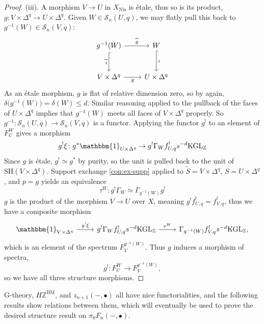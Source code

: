 \documentclass[11pt, twoside]{article}
\numberwithin{equation}{section}
\theoremstyle{definition}
\newcommand{\bb}[1]{\mathbb{#1}}
\newcommand{\Kgl}{\mathrm{KGL}}
\newcommand{\sh}{\mathrm{SH}}
\newcommand{\bm}{\mathrm{BM}}
\newcommand{\nis}{\mathrm{Nis}}
\newcommand{\G}{\mathrm{G}}
\begin{document}
\begin{proof}
\item (iii). A morphism \(V \to U\) in \(X_\nis\) is étale, thus so is its product, \(g \colon V \times \Delta^q \to U \times \Delta^q\). Given \(W \in \mathcal{S}_n(U, q)\), we may flatly pull this back to \(g^{- 1}(W) \in \mathcal{S}_n(V, q)\): 
\[\begin{tikzcd} [row sep = large]
g^{- 1}(W) \ar[d, "\tilde{i}", hookrightarrow, swap] \ar[r, "\tilde{g}"] & W \ar[d, "i", hookrightarrow]\\
V \times \Delta^q \ar[r, "g", swap] & U \times \Delta^q
\end{tikzcd}\]
As an étale morphism, \(g\) is flat of relative dimension zero, so by  \cite[Tag 02R8]{Sta} again, \(\delta\big(g^{- 1}(W)\big) = \delta(W) \leq d\). Similar reasoning applied to the pullback of the faces of \(U \times \Delta^q\) implies that \(g^{- 1}(W)\) meets all faces of \(V \times \Delta^q\) properly. So \(g^{- 1} \colon \mathcal{S}_n(U, q) \to \mathcal{S}_n(V, q)\) is a functor. Applying the functor \(g^!\) to an element of \(F_U^W\)  gives a morphism 
\[g^!\xi \colon g^*\mathbbm{1}_{U \times \Delta^q} \to g^!\Gamma_W f_{U, q}^! s^{- d} \Kgl_\bb{Z}\]
Since \(g\) is étale, \(g^! \simeq g^*\) by purity, so the unit is pulled back to the unit of \(\sh(V \times \Delta^q)\). Support exchange \ref{con:ex-supp} applied to \(\tilde{S} = V \times \Delta^q\), \(S = U \times \Delta^q\), and \(p = g\) yields an equivalence 
\[\tau^W \colon g^! \Gamma_W \simeq \Gamma_{g^{- 1}(W)} g^!\]
\(g\) is the product of the morphism \(V \to U\) over \(X\), meaning \(g^! f_{U, q}^! = f_{V, q}^!\), thus we have a composite morphism 
\[\begin{tikzcd}
\mathbbm{1}_{V \times \Delta^q} \ar[r, "g^! \xi"] & g^! \Gamma_W f_{U, q}^! s^{- d} \Kgl_\bb{Z} \ar[r, "\tau^W"] & \Gamma_{g^{- 1}(W)} f_{V, q}^! s^{- d} \Kgl_\bb{Z},
\end{tikzcd}\]
which is an element of the spectrum \(F_V^{g^{- 1}(W)}\). Thus \(g\) induces a morphism of spectra,
\[g^! \colon F_U^W \to F_V^{g^{- 1}(W)},\]
so we have all three structure morphisms.
\end{proof}

\(\G\)-theory, \(H\bb{Z}^\bm\), and \(z_{n + 1}( -, \bullet)\) all have nice functorialities, and the following results show relations between them, which will eventually be used to prove the desired structure result on \(\pi_0 F_n( -, \bullet)\).
\end{document}
